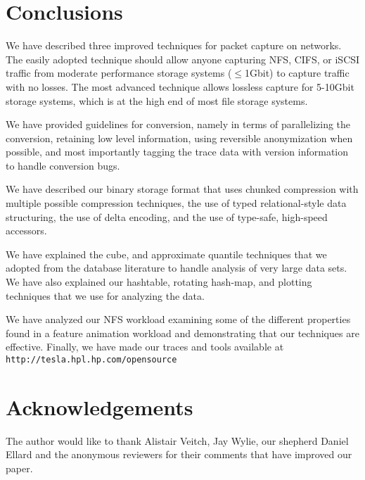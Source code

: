 \section{Conclusions}
\label{sec:conclusion}

We have described three improved techniques for packet capture on
networks.  The easily adopted technique should allow anyone capturing
NFS, CIFS, or iSCSI traffic from moderate performance storage systems
($\leq$1Gbit) to capture traffic with no losses.  The most advanced
technique allows lossless capture for 5-10Gbit storage systems, which
is at the high end of most file storage systems. 

We have provided guidelines for conversion, namely in terms of
parallelizing the conversion, retaining low level information, using
reversible anonymization when possible, and most importantly tagging
the trace data with version information to handle conversion bugs.

We have described our binary storage format that uses chunked
compression with multiple possible compression techniques, the use of
typed relational-style data structuring, the use of delta encoding,
and the use of type-safe, high-speed accessors.

We have explained the cube, and approximate quantile techniques that
we adopted from the database literature to handle analysis of very
large data sets.  We have also explained our hashtable, rotating
hash-map, and plotting techniques that we use for analyzing the data.

We have analyzed our NFS workload examining some of the different
properties found in a feature animation workload and demonstrating
that our techniques are effective.  Finally, we have made our traces
and tools available at {\tt http://tesla.hpl.hp.com/opensource}

\section{Acknowledgements}

The author would like to thank Alistair Veitch, Jay Wylie, our
shepherd Daniel Ellard and the anonymous reviewers for their comments
that have improved our paper.
